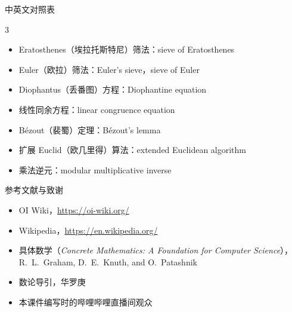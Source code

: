 \documentclass{../pkslide}
\begin{document}
\begin{frame}[c]{中英文对照表}
\begin{adjustwidth}{-.5cm}{}
\begin{mymulticols}[l][l]{3}
\begin{itemize}
        \item Eratosthenes（埃拉托斯特尼）筛法：sieve of Eratosthenes
        \item Euler（欧拉）筛法：Euler's sieve，sieve of Euler
        \item Diophantus（丢番图）方程：Diophantine equation
        \item 线性同余方程：linear congruence equation
        \item Bézout（裴蜀）定理：Bézout's lemma
        \item 扩展 Euclid（欧几里得）算法：extended Euclidean algorithm
        \item 乘法逆元：modular multiplicative inverse
      \end{itemize}
    \end{mymulticols}
  \end{adjustwidth}
\end{frame}

\begin{frame}[c]{参考文献与致谢}
  \begin{itemize}
    \item OI Wiki，\url{https://oi-wiki.org/}
    \item Wikipedia，\url{https://en.wikipedia.org/}
    \item 具体数学（\textit{Concrete Mathematics: A Foundation for Computer Science}），R.~L.~Graham, D.~E.~Knuth, and O.~Patashnik
    \item 数论导引，华罗庚
    \item 本课件编写时的哔哩哔哩直播间观众
  \end{itemize}
\end{frame}
\end{document}
